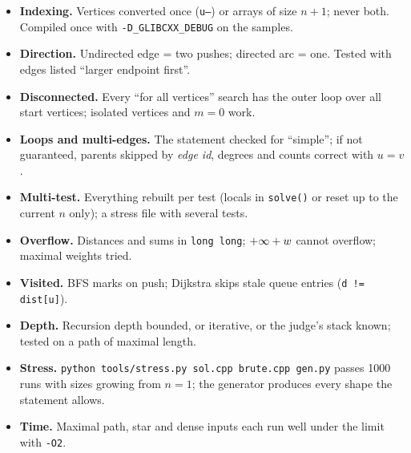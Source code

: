 \begin{checklistbox}
\begin{itemize}[leftmargin=*]
    \item \textbf{Indexing.} Vertices converted once (\texttt{u--}) or arrays of size $n+1$; never both. Compiled once with \texttt{-D\_GLIBCXX\_DEBUG} on the samples.
    \item \textbf{Direction.} Undirected edge = two pushes; directed arc = one. Tested with edges listed ``larger endpoint first''.
    \item \textbf{Disconnected.} Every ``for all vertices'' search has the outer loop over all start vertices; isolated vertices and $m=0$ work.
    \item \textbf{Loops and multi-edges.} The statement checked for ``simple''; if not guaranteed, parents skipped by \emph{edge id}, degrees and counts correct with $u=v$.
    \item \textbf{Multi-test.} Everything rebuilt per test (locals in \texttt{solve()} or reset up to the current $n$ only); a stress file with several tests.
    \item \textbf{Overflow.} Distances and sums in \texttt{long long}; $+\infty + w$ cannot overflow; maximal weights tried.
    \item \textbf{Visited.} BFS marks on push; Dijkstra skips stale queue entries (\texttt{d != dist[u]}).
    \item \textbf{Depth.} Recursion depth bounded, or iterative, or the judge's stack known; tested on a path of maximal length.
    \item \textbf{Stress.} \texttt{python tools/stress.py sol.cpp brute.cpp gen.py} passes 1000 runs with sizes growing from $n=1$; the generator produces every shape the statement allows.
    \item \textbf{Time.} Maximal path, star and dense inputs each run well under the limit with \texttt{-O2}.
\end{itemize}
\end{checklistbox}
